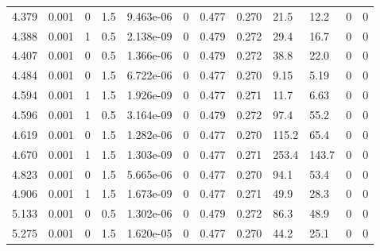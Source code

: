 \documentclass[preview]{standalone}
\begin{document}
{{\begin{tabular}{L{1.2cm}C{1.2cm} C{0.3cm}C{0.5cm} C{1.4cm}C{1.4cm} C{1.4cm}C{1.4cm} C{1.6cm}C{1.6cm} C{1.6cm}C{1.6cm}}
  4.379  &  0.001  & 0     & 1.5 &  9.463e-06  & 0  &  0.477&   0.270& 21.5 & 12.2   &  0 & 0  \\ 
  4.388  &  0.001  & 1     & 0.5 &  2.138e-09  & 0  &  0.479&   0.272& 29.4 & 16.7   &  0 & 0  \\ 
  4.407  &  0.001  & 0     & 0.5 &  1.366e-06  & 0  &  0.479&   0.272& 38.8 & 22.0   &  0 & 0  \\ 
  4.484  &  0.001  & 0     & 1.5 &  6.722e-06  & 0  &  0.477&   0.270& 9.15 & 5.19   &  0 & 0  \\ 
  4.594  &  0.001  & 1     & 1.5 &  1.926e-09  & 0  &  0.477&   0.271& 11.7 & 6.63   &  0 & 0  \\ 
  4.596  &  0.001  & 1     & 0.5 &  3.164e-09  & 0  &  0.479&   0.272& 97.4 & 55.2   &  0 & 0  \\ 
  4.619  &  0.001  & 0     & 1.5 &  1.282e-06  & 0  &  0.477&   0.270& 115.2 & 65.4   &  0 & 0  \\ 
  4.670  &  0.001  & 1     & 1.5 &  1.303e-09  & 0  &  0.477&   0.271& 253.4 & 143.7   &  0 & 0  \\ 
  4.823  &  0.001  & 0     & 1.5 &  5.665e-06  & 0  &  0.477&   0.270& 94.1 & 53.4   &  0 & 0  \\ 
  4.906  &  0.001  & 1     & 1.5 &  1.673e-09  & 0  &  0.477&   0.271& 49.9 & 28.3   &  0 & 0  \\ 
  5.133  &  0.001  & 0     & 0.5 &  1.302e-06  & 0  &  0.479&   0.272& 86.3 & 48.9   &  0 & 0  \\ 
  5.275  &  0.001  & 0     & 1.5 &  1.620e-05  & 0  &  0.477&   0.270& 44.2 & 25.1   &  0 & 0  \\ 
\hline 
\end{tabular} 

}}
\end{document}
